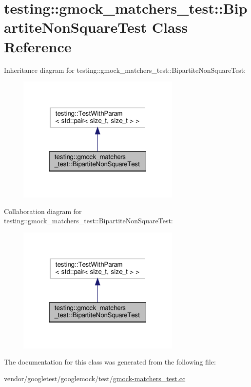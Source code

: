 \hypertarget{classtesting_1_1gmock__matchers__test_1_1_bipartite_non_square_test}{}\section{testing\+:\+:gmock\+\_\+matchers\+\_\+test\+:\+:Bipartite\+Non\+Square\+Test Class Reference}
\label{classtesting_1_1gmock__matchers__test_1_1_bipartite_non_square_test}


Inheritance diagram for testing\+:\+:gmock\+\_\+matchers\+\_\+test\+:\+:Bipartite\+Non\+Square\+Test\+:
\nopagebreak
\begin{figure}[H]
\begin{center}
\leavevmode
\includegraphics[width=229pt]{classtesting_1_1gmock__matchers__test_1_1_bipartite_non_square_test__inherit__graph}
\end{center}
\end{figure}


Collaboration diagram for testing\+:\+:gmock\+\_\+matchers\+\_\+test\+:\+:Bipartite\+Non\+Square\+Test\+:
\nopagebreak
\begin{figure}[H]
\begin{center}
\leavevmode
\includegraphics[width=229pt]{classtesting_1_1gmock__matchers__test_1_1_bipartite_non_square_test__coll__graph}
\end{center}
\end{figure}


The documentation for this class was generated from the following file\+:\begin{DoxyCompactItemize}
\item 
vendor/googletest/googlemock/test/\hyperlink{gmock-matchers__test_8cc}{gmock-\/matchers\+\_\+test.\+cc}\end{DoxyCompactItemize}
